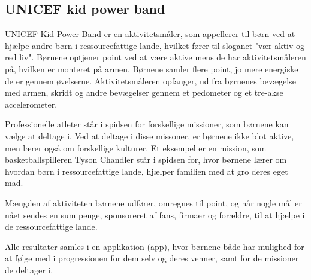 
\subsection{UNICEF kid power band}
UNICEF Kid Power Band er en aktivitetsmåler, som appellerer til børn ved at hjælpe andre børn i ressourcefattige lande, hvilket fører til sloganet "vær aktiv og red liv". Børnene optjener point ved at være aktive mens de har aktivitetsmåleren på, hvilken er monteret på armen. Børnene samler flere point, jo mere energiske de er gennem øvelserne. Aktivitetsmåleren opfanger, ud fra børnenes bevægelse med armen, skridt og andre bevægelser gennem et pedometer og et tre-akse accelerometer. \citep{PowerAbout2015,PowerManual2015} \newline 



Professionelle atleter står i spidsen for forskellige missioner, som børnene kan vælge at deltage i. Ved at deltage i disse missoner, er børnene ikke blot aktive, men lærer også om forskellige kulturer. Et eksempel er en mission, som basketballspilleren Tyson Chandler står i spidsen for, hvor børnene lærer om hvordan børn i ressourcefattige lande, hjælper familien med at gro deres eget mad. \citep{PowerMission2015} \newline

Mængden af aktiviteten børnene udfører, omregnes til point, og når nogle mål er nået sendes en sum penge, sponsoreret af fans, firmaer og forældre, til at hjælpe i de ressourcefattige lande. \newline

Alle resultater samles i en applikation (app), hvor børnene både har mulighed for at følge med i progressionen for dem selv og deres venner, samt for de missioner de deltager i. \citep{PowerAbout2015}


